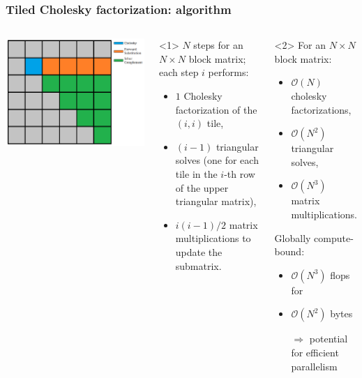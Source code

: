 \documentclass{beamer}
\begin{document}
\begin{frame}
  \frametitle{Tiled Cholesky factorization: algorithm}

  \begin{columns}[T]
    \includegraphics[width=\textwidth]{Cholesky_2ndStep.png}
    
    \begin{onlyenv}<1>
      $N$ steps for an $N \times N$ block matrix;\\
      each step $i$ performs:
      \begin{itemize}
      \item $1$ Cholesky factorization of the $(i,i)$ tile,
      \item $(i-1)$ triangular solves (one for each tile in the $i$-th row of the upper triangular matrix),
      \item $i(i-1)/2$ matrix multiplications to update the submatrix.
      \end{itemize}
    \end{onlyenv}
    \begin{onlyenv}<2>
      For an $N \times N$ block matrix:\\
      \begin{itemize}
      \item $\mathcal{O}(N)$ cholesky factorizations,
      \item $\mathcal{O}(N^2)$ triangular solves,
      \item $\mathcal{O}(N^3)$ matrix multiplications.
        \medskip
      \end{itemize}
      Globally compute-bound:
      \begin{itemize}
      \item $\mathcal{O}(N^3)$ flops for
      \item $\mathcal{O}(N^2)$ bytes
      \item[$\Rightarrow$] potential for efficient parallelism
      \end{itemize}
    \end{onlyenv}
  \end{columns}
\end{frame}
\end{document}

